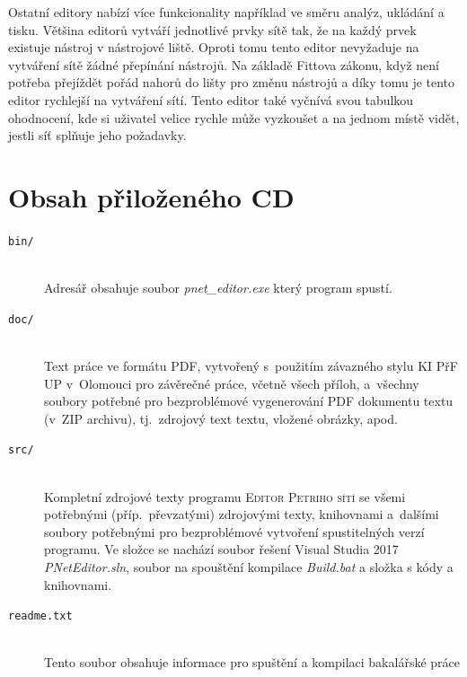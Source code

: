 \documentclass[
  biblatex,
  glossaries,
]{kidiplom}
\begin{document}
Ostatní editory nabízí více funkcionality například ve směru analýz, 
ukládání a tisku. Většina editorů vytváří jednotlivé prvky sítě tak,
že na každý prvek existuje nástroj v nástrojové liště. Oproti tomu 
tento editor nevyžaduje na vytváření sítě žádné přepínání nástrojů.
Na základě Fittova zákonu, když není potřeba přejíždět pořád nahorů do lišty 
pro změnu nástrojů a díky tomu je tento editor rychlejší na vytváření sítí.
Tento editor také vyčnívá svou tabulkou ohodnocení, kde si uživatel velice 
rychle může vyzkoušet a na jednom místě vidět, jestli síť splňuje jeho požadavky.




\section{Obsah přiloženého CD} \label{sec:ObsahCD}

\begin{description}
  \item[\texttt{bin/}] \hfill \\
        Adresář obsahuje soubor \textit{pnet\_editor.exe} který program spustí. 

  \item[\texttt{doc/}] \hfill \\
        Text práce ve formátu PDF, vytvořený s~použitím závazného stylu KI
        PřF UP v~Olomouci pro závěrečné práce, včetně všech příloh,
        a~všechny soubory potřebné pro bezproblémové vygenerování PDF
        dokumentu textu (v~ZIP archivu), tj.~zdrojový text textu, vložené
        obrázky, apod.

  \item[\texttt{src/}] \hfill \\
        Kompletní zdrojové texty programu \textsc{Editor Petriho sítí} 
        se všemi potřebnými (příp.~převzatými) zdrojovými
        texty, knihovnami a~dalšími soubory potřebnými pro bezproblémové
        vytvoření spustitelných verzí programu. Ve složce se nachází
        soubor řešení Visual Studia 2017 \textit{PNetEditor.sln},
        soubor na spouštění kompilace \textit{Build.bat} a
        složka s kódy a knihovnami.
        

  \item[\texttt{readme.txt}] \hfill \\
        Tento soubor obsahuje informace pro spuštění a kompilaci bakalářské práce 

\end{description}
\end{document}
